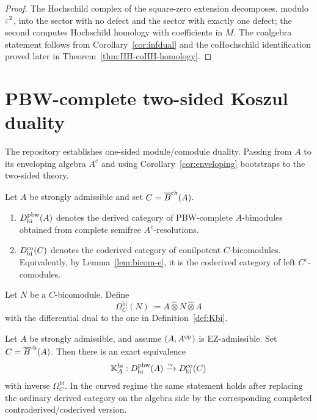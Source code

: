 \begin{proof}
The Hochschild complex of the square-zero extension decomposes, modulo $\varepsilon^2$, into the sector with
no defect and the sector with exactly one defect; the second computes Hochschild homology with
coefficients in $M$. The coalgebra statement follows from
Corollary~\ref{cor:infdual} and the coHochschild identification proved later in
Theorem~\ref{thm:HH-coHH-homology}.
\end{proof}

\section{PBW-complete two-sided Koszul duality}
\label{sec:bimod-bicomod}

The repository establishes one-sided module/comodule duality.
Passing from $A$ to its enveloping algebra $A^e$ and using
Corollary~\ref{cor:enveloping} bootstraps to the two-sided theory.

\begin{definition}
Let $A$ be strongly admissible and set $C=\overline{B}^{\mathrm{ch}}(A)$.
\begin{enumerate}[label=(\alph*)]
\item $D^{\mathrm{pbw}}_{\mathrm{bi}}(A)$ denotes the derived category of PBW-complete $A$-bimodules obtained
from complete semifree $A^e$-resolutions.

\item $D^{\mathrm{co}}_{\mathrm{bi}}(C)$ denotes the coderived category of conilpotent $C$-bicomodules.
Equivalently, by Lemma~\ref{lem:bicom-e}, it is the coderived category of left $C^e$-comodules.
\end{enumerate}
\end{definition}

\begin{definition}
Let $N$ be a $C$-bicomodule. Define
\[
\Omega_C^{\mathrm{bi}}(N):=A\widehat\otimes N\widehat\otimes A
\]
with the differential dual to the one in Definition~\ref{def:Kbi}.
\end{definition}

\begin{theorem}
\label{thm:bimod-bicomod}
Let $A$ be strongly admissible, and assume $(A,A^{\mathrm{op}})$ is EZ-admissible.
Set $C=\overline{B}^{\mathrm{ch}}(A)$.
Then there is an exact equivalence
\[
\mathbb{K}_A^{\mathrm{bi}}:D^{\mathrm{pbw}}_{\mathrm{bi}}(A)\xrightarrow{\sim}D^{\mathrm{co}}_{\mathrm{bi}}(C)
\]
with inverse $\Omega_C^{\mathrm{bi}}$. In the curved regime the same statement holds after replacing
the ordinary derived category on the algebra side by the corresponding completed
contra\-derived/coderived version.
\end{theorem}

